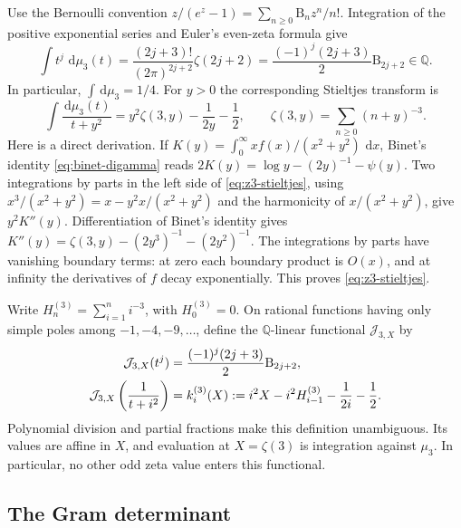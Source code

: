 \documentclass[11pt,letterpaper]{article}
\theoremstyle{definition}
\newcommand{\Q}{\mathbb Q}
\newcommand{\dd}{\,\mathrm d}
\begin{document}
Use the Bernoulli convention
$z/(e^z-1)=\sum_{n\ge0}\mathrm B_nz^n/n!$. Integration of the positive
exponential series and Euler's even-zeta formula give
\begin{equation}\label{eq:z3-moments}
 \int t^j\,\dd\mu_3(t)
 =\frac{(2j+3)!}{(2\pi)^{2j+2}}\zeta(2j+2)
 =\frac{(-1)^j(2j+3)}2\mathrm B_{2j+2}\in\Q.
\end{equation}
In particular, $\int\dd\mu_3=1/4$.
For $y>0$ the corresponding Stieltjes transform is
\begin{equation}\label{eq:z3-stieltjes}
 \int\frac{\dd\mu_3(t)}{t+y^2}
 =y^2\zeta(3,y)-\frac1{2y}-\frac12,
 \qquad \zeta(3,y)=\sum_{n\ge0}(n+y)^{-3}.
\end{equation}
Here is a direct derivation. If
$K(y)=\int_0^\infty xf(x)/(x^2+y^2)\,\dd x$, Binet's identity
\eqref{eq:binet-digamma} reads
$2K(y)=\log y-(2y)^{-1}-\psi(y)$.
Two integrations by parts in the left side of
\eqref{eq:z3-stieltjes}, using
$x^3/(x^2+y^2)=x-y^2x/(x^2+y^2)$ and the harmonicity of
$x/(x^2+y^2)$, give $y^2K''(y)$. Differentiation of Binet's identity
gives $K''(y)=\zeta(3,y)-(2y^3)^{-1}-(2y^2)^{-1}$.
The integrations by parts have vanishing boundary terms: at zero each
boundary product is $O(x)$, and at infinity the derivatives of $f$
decay exponentially. This proves \eqref{eq:z3-stieltjes}.

Write $H_n^{(3)}=\sum_{i=1}^n i^{-3}$, with $H_0^{(3)}=0$. On rational
functions having only simple poles among $-1,-4,-9,\ldots$, define the
$\Q$-linear functional $\mathcal J_{3,X}$ by
\begin{align}
 \mathcal J_{3,X}(t^j)
   &=\frac{(-1)^j(2j+3)}2\mathrm B_{2j+2},\notag\\
 \mathcal J_{3,X}\left(\frac1{t+i^2}\right)
   &=k_i^{(3)}(X)
     :=i^2X-i^2H_{i-1}^{(3)}-\frac1{2i}-\frac12.
       \label{eq:z3-functional}
\end{align}
Polynomial division and partial fractions make this definition
unambiguous. Its values are affine in $X$, and evaluation at $X=\zeta(3)$
is integration against $\mu_3$. In particular, no other odd zeta value
enters this functional.

\subsection{The Gram determinant}
\end{document}
